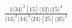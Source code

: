 \documentclass[varwidth, border=5pt]{standalone}
\begin{document}
\begin{my}
$\begin{gathered}
\scriptscriptstyle\frac{1⟨34⟩^2[15]⟨12⟩⟨15⟩^4}{⟨13⟩^2⟨14⟩^3⟨24⟩[25]⟨35⟩^2}
\end{gathered}$
\end{my}
\end{document}
